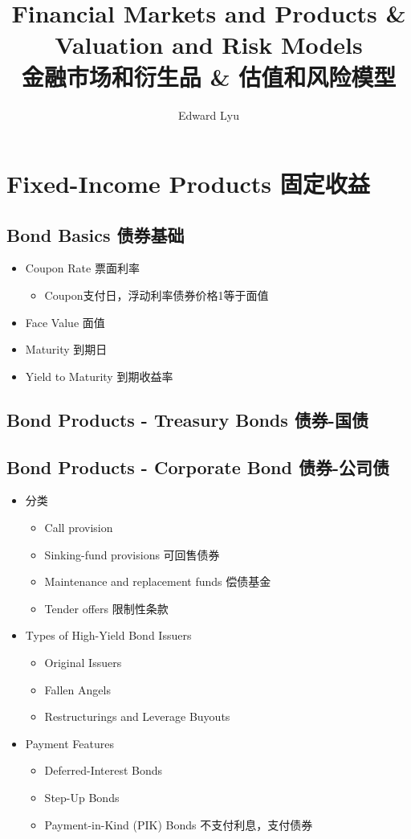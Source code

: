 \documentclass[a4paper,6pt,twoside,openany]{article}
\title{Financial Markets and Products \& Valuation and Risk Models \\ 金融市场和衍生品 \& 估值和风险模型}
\author{Edward Lyu}
\begin{document}
\maketitle

\tableofcontents

\section{Fixed-Income Products 固定收益}
\subsection{Bond Basics 债券基础}
\begin{itemize}
\item Coupon Rate 票面利率
  \begin{itemize}
  \item Coupon支付日，浮动利率债券价格1等于面值
  \end{itemize}
\item Face Value 面值
\item Maturity 到期日
\item Yield to Maturity 到期收益率
\end{itemize}
\subsection{Bond Products - Treasury Bonds 债券-国债}
\subsection{Bond Products - Corporate Bond 债券-公司债}
\begin{itemize}
\item 分类
  \begin{itemize}
  \item Call provision
  \item Sinking-fund provisions 可回售债券
  \item Maintenance and replacement funds 偿债基金
  \item Tender offers 限制性条款
  \end{itemize}
\item Types of High-Yield Bond Issuers
  \begin{itemize}
  \item Original Issuers
  \item Fallen Angels
  \item Restructurings and Leverage Buyouts
  \end{itemize}
\item Payment Features
  \begin{itemize}
  \item Deferred-Interest Bonds
  \item Step-Up Bonds
  \item Payment-in-Kind (PIK) Bonds 不支付利息，支付债券
  \end{itemize}
\end{itemize}
\end{document}
